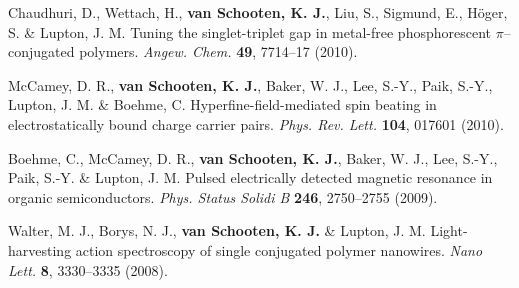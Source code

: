 \documentclass[11pt,letterpaper]{article}
\begin{document}
\begin{bibenum}
	\item Chaudhuri, D., Wettach, H., \textbf{van Schooten, K. J.}, Liu, S., Sigmund, E., H\"{o}ger, S. \& Lupton, J. M. Tuning the singlet-triplet gap in metal-free phosphorescent $\pi$--conjugated polymers. \textit{Angew. Chem.} \textbf{49}, 7714--17 (2010).  
	
	\item McCamey, D. R., \textbf{van Schooten, K. J.}, Baker, W. J., Lee, S.-Y., Paik, S.-Y., Lupton, J. M. \& Boehme, C. Hyperfine-field-mediated spin beating in electrostatically bound charge carrier pairs. \textit{Phys. Rev. Lett.} \textbf{104}, 017601 (2010).  
	
	\item Boehme, C., McCamey, D. R., \textbf{van Schooten, K. J.}, Baker, W. J., Lee, S.-Y., Paik, S.-Y. \& Lupton, J. M. Pulsed electrically detected magnetic resonance in organic semiconductors. \textit{Phys. Status Solidi B} \textbf{246}, 2750--2755 (2009).  
	
	\item Walter, M. J., Borys, N. J., \textbf{van Schooten, K. J.} \& Lupton, J. M. Light-harvesting action spectroscopy of single conjugated polymer nanowires. \textit{Nano Lett.} \textbf{8}, 3330--3335 (2008).  

\end{bibenum}
\vspace{\baselineskip} %
\end{document}
